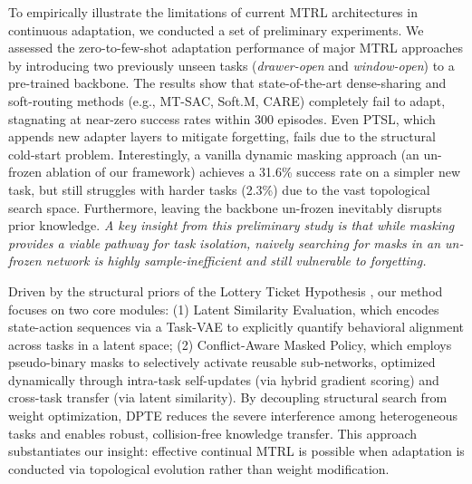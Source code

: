 \documentclass{article}
\begin{document}
To empirically illustrate the limitations of current MTRL architectures in continuous adaptation, we conducted a set of preliminary experiments.
We assessed the zero-to-few-shot adaptation performance of major MTRL approaches by introducing two previously unseen tasks (\textit{drawer-open} and \textit{window-open}) to a pre-trained backbone.
The results show that state-of-the-art dense-sharing and soft-routing methods (e.g., MT-SAC, Soft.M, CARE) completely fail to adapt, stagnating at near-zero success rates within 300 episodes.
Even PTSL, which appends new adapter layers to mitigate forgetting, fails due to the structural cold-start problem.
Interestingly, a vanilla dynamic masking approach (an un-frozen ablation of our framework) achieves a 31.6\% success rate on a simpler new task, but still struggles with harder tasks (2.3\%) due to the vast topological search space.
Furthermore, leaving the backbone un-frozen inevitably disrupts prior knowledge.
\emph{A key insight from this preliminary study is that while masking provides a viable pathway for task isolation, naively searching for masks in an un-frozen network is highly sample-inefficient and still vulnerable to forgetting.}


Driven by the structural priors of the Lottery Ticket Hypothesis \cite{n1}, our method focuses on two core modules:
(1) Latent Similarity Evaluation, which encodes state-action sequences via a Task-VAE to explicitly quantify behavioral alignment across tasks in a latent space;
(2) Conflict-Aware Masked Policy, which employs pseudo-binary masks to selectively activate reusable sub-networks, optimized dynamically through intra-task self-updates (via hybrid gradient scoring) and cross-task transfer (via latent similarity).
By decoupling structural search from weight optimization, DPTE reduces the severe interference among heterogeneous tasks and enables robust, collision-free knowledge transfer.
This approach substantiates our insight: effective continual MTRL is possible when adaptation is conducted via topological evolution rather than weight modification.
\end{document}
